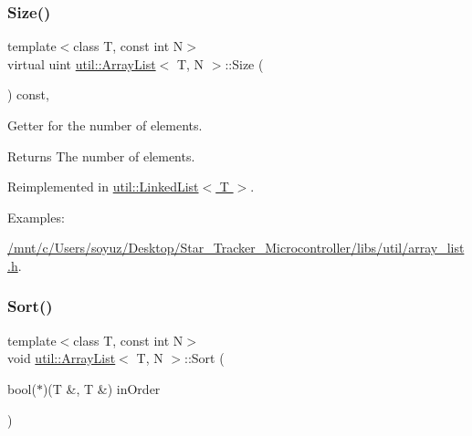 \subsubsection{\texorpdfstring{Size()}{Size()}}
{\footnotesize\ttfamily template$<$class T, const int N$>$ \\
virtual uint \hyperlink{classutil_1_1ArrayList}{util\+::\+Array\+List}$<$ T, N $>$\+::Size (\begin{DoxyParamCaption}{ }\end{DoxyParamCaption}) const\hspace{0.3cm}{\ttfamily [inline]}, {\ttfamily [virtual]}}



Getter for the number of elements. 

\begin{DoxyReturn}{Returns}
The number of elements. 
\end{DoxyReturn}


Reimplemented in \hyperlink{classutil_1_1LinkedList_a83784f0749538889da04deb74b2bdd95}{util\+::\+Linked\+List$<$ T $>$}.

\begin{Desc}
\item[Examples\+: ]\par
\hyperlink{_2mnt_2c_2Users_2soyuz_2Desktop_2Star_Tracker_Microcontroller_2libs_2util_2array_list_8h-example}{/mnt/c/\+Users/soyuz/\+Desktop/\+Star\+\_\+\+Tracker\+\_\+\+Microcontroller/libs/util/array\+\_\+list.\+h}.\end{Desc}
\mbox{\label{classutil_1_1ArrayList_a6f42b37e970d8416b7036e05185ca1d2}} 
\subsubsection{\texorpdfstring{Sort()}{Sort()}}
{\footnotesize\ttfamily template$<$class T, const int N$>$ \\
void \hyperlink{classutil_1_1ArrayList}{util\+::\+Array\+List}$<$ T, N $>$\+::Sort (\begin{DoxyParamCaption}\item[{bool($\ast$)(T \&, T \&)}]{in\+Order }\end{DoxyParamCaption})\hspace{0.3cm}{\ttfamily [inline]}}



